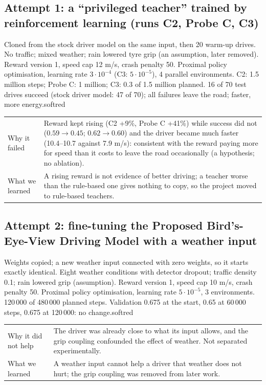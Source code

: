 \subsection*{Attempt 1: a ``privileged teacher'' trained by reinforcement learning (runs C2, Probe C, C3)}
{Cloned from the stock driver model on the same input, then 20 warm-up drives.}
{No traffic; mixed weather; rain lowered tyre grip (an assumption, later removed). Reward version 1, speed cap 12 m/s, crash penalty 50.}
{Proximal policy optimisation, learning rate $3\cdot10^{-4}$ (C3: $5\cdot10^{-5}$), 4 parallel environments. C2: 1.5 million steps; Probe C: 1 million; C3: 0.3 of 1.5 million planned.}
{16 of 70 test drives succeed (stock driver model: 47 of 70); all failures leave the road; faster, more energy.}{softred}
\begin{center}\small
\begin{tabularx}{\textwidth}{@{}>{\raggedright\arraybackslash}p{3.2cm}X@{}}\toprule
Why it failed & Reward kept rising (C2 +9\%, Probe C +41\%) while success did not ($0.59\to0.45$; $0.62\to0.60$) and the driver became much faster (10.4--10.7 against 7.9 m/s): consistent with the reward paying more for speed than it costs to leave the road occasionally (a hypothesis; no ablation).\\
What we learned & A rising reward is not evidence of better driving; a teacher worse than the rule-based one gives nothing to copy, so the project moved to rule-based teachers.\\\bottomrule
\end{tabularx}
\end{center}

\subsection*{Attempt 2: fine-tuning the Proposed Bird's-Eye-View Driving Model with a weather input}
{Weights copied; a new weather input connected with zero weights, so it starts exactly identical.}
{Eight weather conditions with detector dropout; traffic density 0.1; rain lowered grip (assumption). Reward version 1, speed cap 10 m/s, crash penalty 50.}
{Proximal policy optimisation, learning rate $5\cdot10^{-5}$, 3 environments. 120\,000 of 480\,000 planned steps.}
{Validation 0.675 at the start, 0.65 at 60\,000 steps, 0.675 at 120\,000: no change.}{softred}
\begin{center}\small
\begin{tabularx}{\textwidth}{@{}>{\raggedright\arraybackslash}p{3.2cm}X@{}}\toprule
Why it did not help & The driver was already close to what its input allows, and the grip coupling confounded the effect of weather. Not separated experimentally.\\
What we learned & A weather input cannot help a driver that weather does not hurt; the grip coupling was removed from later work.\\\bottomrule
\end{tabularx}
\end{center}

